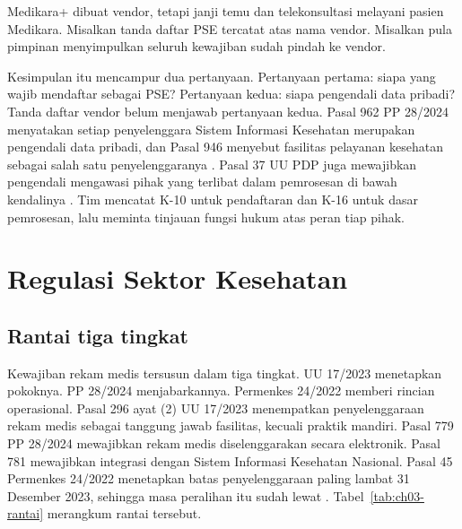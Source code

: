 \begin{kasus}[title={Kasus Medikara Health: Siapa PSE untuk Medikara+?}]
Medikara+ dibuat vendor, tetapi janji temu dan telekonsultasi melayani pasien Medikara. Misalkan
tanda daftar PSE tercatat atas nama vendor. Misalkan pula pimpinan menyimpulkan seluruh
kewajiban sudah pindah ke vendor.

Kesimpulan itu mencampur dua pertanyaan. Pertanyaan pertama: siapa yang wajib mendaftar sebagai
PSE? Pertanyaan kedua: siapa pengendali data pribadi? Tanda daftar vendor belum menjawab
pertanyaan kedua. Pasal 962 PP 28/2024 menyatakan setiap penyelenggara Sistem Informasi
Kesehatan merupakan pengendali data pribadi, dan Pasal 946 menyebut fasilitas pelayanan kesehatan
sebagai salah satu penyelenggaranya \cite{pp28-2024-kesehatan}. Pasal 37 UU PDP juga mewajibkan
pengendali mengawasi pihak yang terlibat dalam pemrosesan di bawah kendalinya
\cite{uu27-2022-pdp}. Tim mencatat K-10 untuk pendaftaran dan K-16 untuk dasar pemrosesan, lalu
meminta tinjauan fungsi hukum atas peran tiap pihak.
\end{kasus}

\section{Regulasi Sektor Kesehatan}

\subsection*{Rantai tiga tingkat}

Kewajiban rekam medis tersusun dalam tiga tingkat. UU 17/2023 menetapkan pokoknya. PP 28/2024
menjabarkannya. Permenkes 24/2022 memberi rincian operasional. Pasal 296 ayat (2) UU 17/2023
menempatkan penyelenggaraan rekam medis sebagai tanggung jawab fasilitas, kecuali praktik
mandiri. Pasal 779 PP 28/2024 mewajibkan rekam medis diselenggarakan secara elektronik. Pasal
781 mewajibkan integrasi dengan Sistem Informasi Kesehatan Nasional. Pasal 45 Permenkes 24/2022
menetapkan batas penyelenggaraan paling lambat 31 Desember 2023, sehingga masa peralihan itu
sudah lewat \cite{c03-uu17,pp28-2024-kesehatan,permenkes24-2022}. Tabel~\ref{tab:ch03-rantai}
merangkum rantai tersebut.

